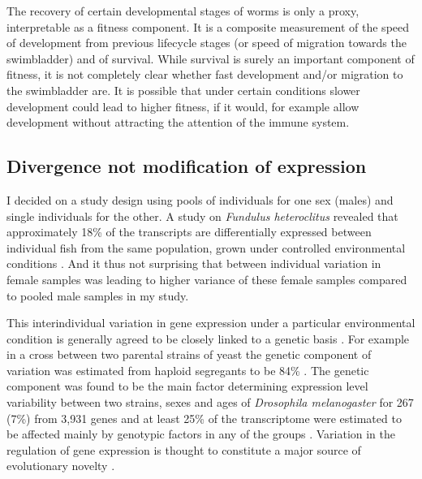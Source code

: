 \documentclass[10pt]{article}
\begin{document}
The recovery of certain developmental stages of worms is only a proxy,
interpretable as a fitness component. It is a composite measurement of
the speed of development from previous lifecycle stages (or speed of
migration towards the swimbladder) and of survival. While survival is
surely an important component of fitness, it is not completely clear
whether fast development and/or migration to the swimbladder are. It
is possible that under certain conditions slower development could
lead to higher fitness, if it would, for example allow development
without attracting the attention of the immune system.

\subsection{Divergence not modification of expression}
\label{sec:sample-twelve}

I decided on a study design using pools of individuals for one sex
(males) and single individuals for the other. A study on
\textit{Fundulus heteroclitus} revealed that approximately 18\% of the
transcripts are differentially expressed between individual fish from
the same population, grown under controlled environmental conditions
\cite{pmid12219088}. And it thus not surprising that between
individual variation in female samples was leading to higher variance
of these female samples compared to pooled male samples in my study.

This interindividual variation in gene expression under a particular
environmental condition is generally agreed to be closely linked to a
genetic basis \cite{pmid15498452}. For example in a cross between two
parental strains of yeast the genetic component of variation was
estimated from haploid segregants to be 84\% \cite{pmid11923494}. The
genetic component was found to be the main factor determining
expression level variability between two strains, sexes and ages of
\textit{Drosophila melanogaster} for 267 (7\%) from 3,931 genes and at
least 25\% of the transcriptome were estimated to be affected mainly
by genotypic factors in any of the groups
\cite{pmid11726925}. Variation in the regulation of gene expression is
thought to constitute a major source of evolutionary novelty
\cite{pmid11341673}.
\end{document}
